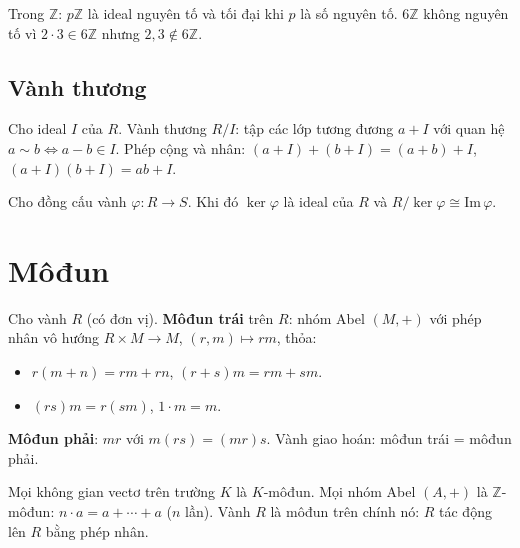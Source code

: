 \documentclass[12pt,a4paper]{article}
\begin{document}
\begin{vidu}
  Trong $\mathbb{Z}$: $p\mathbb{Z}$ là ideal nguyên tố và tối đại khi $p$ là số nguyên tố. $6\mathbb{Z}$ không nguyên tố vì $2 \cdot 3 \in 6\mathbb{Z}$ nhưng $2, 3 \notin 6\mathbb{Z}$.
\end{vidu}

\subsection{Vành thương}

\begin{dinhnghia}
  Cho ideal $I$ của $R$. Vành thương $R/I$: tập các lớp tương đương $a + I$ với quan hệ $a \sim b \Leftrightarrow a - b \in I$. Phép cộng và nhân: $(a+I) + (b+I) = (a+b) + I$, $(a+I)(b+I) = ab + I$.
\end{dinhnghia}

\begin{dinhly}[title={Định lý đồng cấu vành}]
  Cho đồng cấu vành $\varphi: R \to S$. Khi đó $\ker \varphi$ là ideal của $R$ và $R/\ker \varphi \cong \mathrm{Im}\,\varphi$.
\end{dinhly}

\section{Môđun}

\begin{dinhnghia}
  Cho vành $R$ (có đơn vị). \textbf{Môđun trái} trên $R$: nhóm Abel $(M, +)$ với phép nhân vô hướng $R \times M \to M$, $(r, m) \mapsto rm$, thỏa:
  \begin{itemize}
    \item $r(m + n) = rm + rn$, $(r + s)m = rm + sm$.
    \item $(rs)m = r(sm)$, $1 \cdot m = m$.
  \end{itemize}
  \textbf{Môđun phải}: $mr$ với $m(rs) = (mr)s$. Vành giao hoán: môđun trái = môđun phải.
\end{dinhnghia}

\begin{vidu}
  Mọi không gian vectơ trên trường $K$ là $K$-môđun. Mọi nhóm Abel $(A, +)$ là $\mathbb{Z}$-môđun: $n \cdot a = a + \cdots + a$ ($n$ lần). Vành $R$ là môđun trên chính nó: $R$ tác động lên $R$ bằng phép nhân.
\end{vidu}
\end{document}
